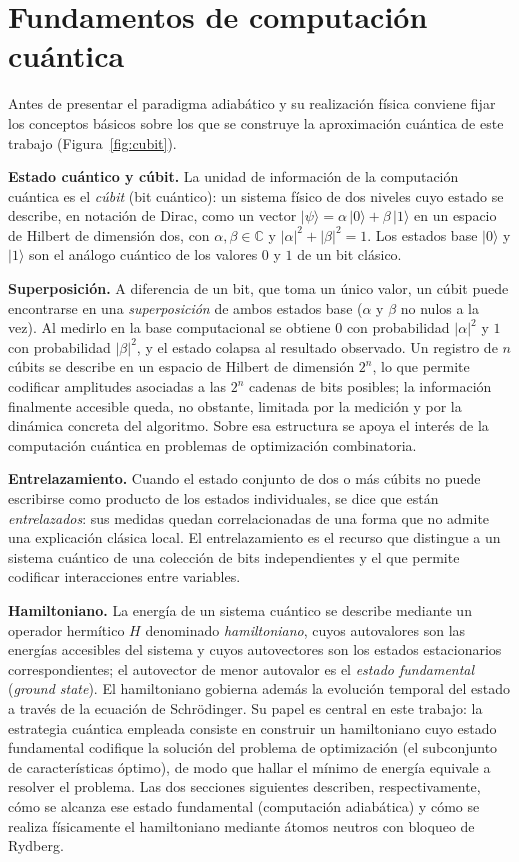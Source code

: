 \section{Fundamentos de computación cuántica}
\label{sec:mt-fundamentos-cuantica}

Antes de presentar el paradigma adiabático y su realización física
conviene fijar los conceptos básicos sobre los que se construye la
aproximación cuántica de este trabajo (Figura~\ref{fig:cubit}).

\textbf{Estado cuántico y cúbit.} La unidad de información de la
computación cuántica es el \emph{cúbit} (bit cuántico): un sistema físico
de dos niveles cuyo estado se describe, en notación de Dirac, como un
vector $|\psi\rangle = \alpha\,|0\rangle + \beta\,|1\rangle$ en un espacio
de Hilbert de dimensión dos, con $\alpha,\beta\in\mathbb{C}$ y
$|\alpha|^2+|\beta|^2=1$. Los estados base $|0\rangle$ y $|1\rangle$ son el
análogo cuántico de los valores $0$ y $1$ de un bit clásico.

\textbf{Superposición.} A diferencia de un bit, que toma un único valor,
un cúbit puede encontrarse en una \emph{superposición} de ambos estados
base ($\alpha$ y $\beta$ no nulos a la vez). Al medirlo en la base
computacional se obtiene $0$ con probabilidad $|\alpha|^2$ y $1$ con
probabilidad $|\beta|^2$, y el estado colapsa al resultado observado. Un
registro de $n$ cúbits se describe en un espacio de Hilbert de dimensión
$2^n$, lo que permite codificar amplitudes asociadas a las $2^n$ cadenas
de bits posibles; la información finalmente accesible queda, no obstante,
limitada por la medición y por la dinámica concreta del algoritmo. Sobre
esa estructura se apoya el interés de la computación cuántica en
problemas de optimización combinatoria.

\textbf{Entrelazamiento.} Cuando el estado conjunto de dos o más cúbits no
puede escribirse como producto de los estados individuales, se dice que
están \emph{entrelazados}: sus medidas quedan correlacionadas de una forma
que no admite una explicación clásica local. El entrelazamiento es el
recurso que distingue a un sistema cuántico de una colección de bits
independientes y el que permite codificar interacciones entre variables.

\textbf{Hamiltoniano.} La energía de un sistema cuántico se describe
mediante un operador hermítico $H$ denominado \emph{hamiltoniano}, cuyos
autovalores son las energías accesibles del sistema y cuyos autovectores
son los estados estacionarios correspondientes; el autovector de menor
autovalor es el \emph{estado fundamental} (\textit{ground state}). El
hamiltoniano gobierna además la evolución temporal del estado a través de
la ecuación de Schrödinger. Su papel es central en este trabajo: la
estrategia cuántica empleada consiste en construir un hamiltoniano cuyo
estado fundamental codifique la solución del problema de optimización
(el subconjunto de características óptimo), de modo que hallar el
mínimo de energía equivale a resolver el problema. Las dos secciones
siguientes describen, respectivamente, cómo se alcanza ese estado
fundamental (computación adiabática) y cómo se realiza físicamente el
hamiltoniano mediante átomos neutros con bloqueo de Rydberg.

